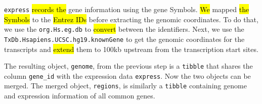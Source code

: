\documentclass[9pt,a4paper,]{extarticle}
\newenvironment{Shaded}{\begin{snugshade}}{\end{snugshade}}
\newcommand{\AttributeTok}[1]{\textcolor[rgb]{0.77,0.63,0.00}{#1}}
\newcommand{\CommentTok}[1]{\textcolor[rgb]{0.56,0.35,0.01}{\textit{#1}}}
\newcommand{\DecValTok}[1]{\textcolor[rgb]{0.00,0.00,0.81}{#1}}
\newcommand{\FunctionTok}[1]{\textcolor[rgb]{0.00,0.00,0.00}{#1}}
\newcommand{\NormalTok}[1]{#1}
\newcommand{\OtherTok}[1]{\textcolor[rgb]{0.56,0.35,0.01}{#1}}
\newcommand{\SpecialCharTok}[1]{\textcolor[rgb]{0.00,0.00,0.00}{#1}}
\newcommand{\StringTok}[1]{\textcolor[rgb]{0.31,0.60,0.02}{#1}}
\begin{document}
\texttt{express} \hl{records the} gene information using the gene Symbols. \hl{We} mapped \hl{the Symbols} to the \hl{Entrez IDs} before extracting the genomic coordinates. To do that, we use the \texttt{org.Hs.eg.db} to \hl{convert} between the identifiers. Next, we use the \texttt{TxDb.Hsapiens.UCSC.hg19.knownGene} to get the genomic coordinates for the transcripts and \hl{extend} them to 100kb upstream from the transcription start sites.

\begin{Shaded}
\end{Shaded}

The resulting object, \texttt{genome}, from the previous step is a \texttt{tibble} that shares the column \texttt{gene\_id} with the expression data \texttt{express}. Now the two objects can be merged. The merged object, \texttt{regions}, is similarly a \texttt{tibble} containing genome and expression information of all common genes.
\end{document}
